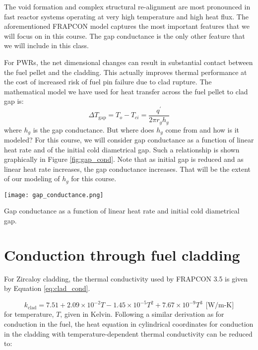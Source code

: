 The void formation and complex structural re-alignment are most pronounced in fast reactor systems operating at very high temperature and high heat flux.  The aforementioned FRAPCON model captures the most important features that we will focus on in this course.  The gap conductance is the only other feature that we will include in this class.  

For PWRs, the net dimensional changes can result in substantial contact between the fuel pellet and the cladding.  This actually improves thermal performance at the cost of increased risk of fuel pin failure due to clad rupture.  The mathematical model we have used for heat transfer across the fuel pellet to clad gap is:
\begin{equation}
\Delta T_{\text{gap}} = T_o - T_{ci} = \frac{q^{\prime}}{2 \pi r_g h_g}
\label{eq:gap_cond_ch23}
\end{equation}
where $h_g$ is the gap conductance.  But where does $h_g$ come from and how is it modeled?  For this course, we will consider gap conductance as a function of linear heat rate and of the initial cold diametrical gap.  Such a relationship is shown graphically in Figure \ref{fig:gap_cond}.  Note that as initial gap is reduced and as linear heat rate increases, the gap conductance increases.  That will be the extent of our modeling of $h_g$ for this course.

\begin{marginfigure}
\texttt{[image: gap\_conductance.png]}
\caption{Gap conductance as a function of linear heat rate and initial cold diametrical gap.}
\label{fig:gap_cond}
\end{marginfigure}


\section{Conduction through fuel cladding}
For Zircaloy cladding, the thermal conductivity used by FRAPCON 3.5 is given by Equation \ref{eq:clad_cond}.

\begin{equation}
k_{\text{clad}} = 7.51 + 2.09 \times 10^{-2}T - 1.45 \times 10^{-5} T^2 + 7.67 \times 10^{-9} T^3\ \ \text{[W/m-K]}
\label{eq:clad_cond}
\end{equation}
for temperature, $T$, given in Kelvin.  Following a similar derivation as for conduction in the fuel, the heat equation in cylindrical coordinates for conduction in the cladding with temperature-dependent thermal conductivity can be reduced to:

